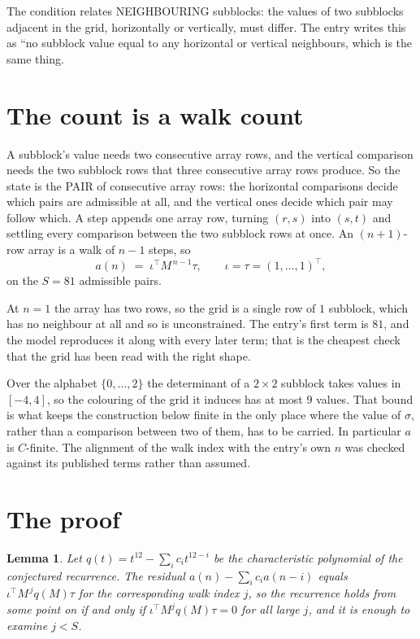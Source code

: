 \documentclass[11pt,a4paper]{article}
\theoremstyle{plain}
\newtheorem{lemma}[theorem]{Lemma}
\theoremstyle{definition}
\begin{document}
The condition relates NEIGHBOURING subblocks: the values of two subblocks adjacent in the grid,
horizontally or vertically, must differ. The entry writes this as ``no subblock value equal to any horizontal or vertical neighbours, which is the same thing.

\section{The count is a walk count}

A subblock's value needs two consecutive array rows, and the vertical
comparison needs the two subblock rows that three consecutive array rows produce. So the state
is the PAIR of consecutive array rows: the horizontal comparisons decide which pairs are
admissible at all, and the vertical ones decide which pair may follow which. A step appends one
array row, turning $(r,s)$ into $(s,t)$ and settling every comparison between the two subblock
rows at once. An $(n+1)$-row array is a walk of $n-1$ steps, so
\[
a(n)\;=\;\iota^{\!\top}M^{\,n-1}\tau,\qquad\iota=\tau=(1,\dots,1)^{\!\top},
\]
on the $S=81$ admissible pairs.

At $n=1$ the array has two rows, so the grid is a single row of $1$
subblock, which has no neighbour at all and so is unconstrained. The
entry's first term is $81$, and the model reproduces it along with every later term; that
is the cheapest check that the grid has been read with the right shape.

Over the alphabet $\{0,\dots,2\}$ the determinant of a $2\times2$ subblock takes values in
$[-4,4]$, so the colouring of the grid it induces has at most $9$ values.
That bound is what keeps the construction below finite in the only place where the value of
$\sigma$, rather than a comparison between two of them, has to be carried.
In particular $a$ is $C$-finite. The alignment of the walk index with the entry's own $n$ was
checked against its published terms rather than assumed.

\section{The proof}

\begin{lemma}\label{lem:crit}
Let $q(t)=t^{12}-\sum_i c_it^{12-i}$ be the characteristic polynomial of the
conjectured recurrence. The residual $a(n)-\sum_ic_ia(n-i)$ equals
$\iota^{\!\top}M^{\,j}q(M)\tau$ for the corresponding walk index $j$, so the recurrence
holds from some point on if and only if $\iota^{\!\top}M^{j}q(M)\tau=0$ for all large $j$,
and it is enough to examine $j<S$.
\end{lemma}
\end{document}
